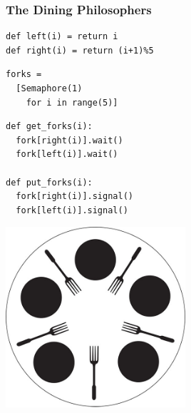 \documentclass{beamer}
\newcommand{\bfr}[1]{\begin{frame}[fragile]\frametitle{{ #1 }}}
\begin{document}
\bfr{The Dining Philosophers}
\begin{multicols}{2}
\begin{Verbatim}[label=Which fork?]
def left(i) = return i
def right(i) = return (i+1)%5
\end{Verbatim}    
\mbox{}
\begin{Verbatim}[label=Initialization]
forks =
  [Semaphore(1)
    for i in range(5)]
\end{Verbatim}    
\mbox{}
\begin{Verbatim}[label=Non-solution]
def get_forks(i):
  fork[right(i)].wait()
  fork[left(i)].wait()

def put_forks(i):
  fork[right(i)].signal()
  fork[left(i)].signal()
\end{Verbatim}    
\columnbreak
\includegraphics[width=0.5\textwidth]{dining-philosophers.jpg}
\end{multicols}
\end{frame}
\end{document}
